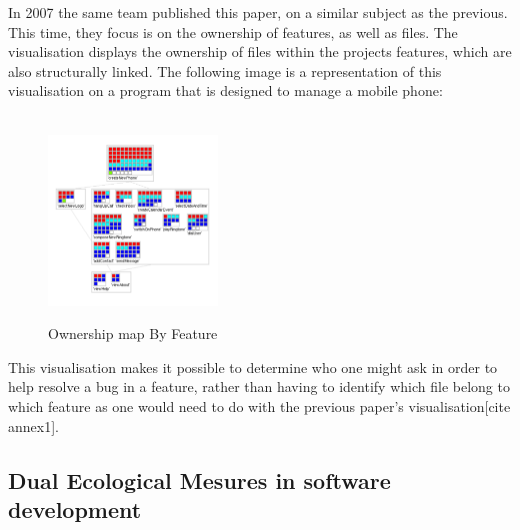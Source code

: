In 2007 the same team published this paper, on a similar subject as the previous. This time, they focus is on the ownership of features, as well as files. The visualisation displays the ownership of files within the projects features, which are also structurally linked. The following image is a representation of this visualisation on a program that is designed to manage a mobile phone:\\
\\
\begin{figure}[p]
\centering
\includegraphics[width=0.4\textwidth]{./resources/girba2007.png}~
\caption{Ownership map By Feature}
\label{fig:ownership_map_by_feature}
\end{figure}

This visualisation makes it possible to determine who one might ask in order to help resolve a bug in a feature, rather than having to identify which file belong to which feature as one would need to do with the previous paper's visualisation[cite annex1].

\subsection{Dual Ecological Mesures in software development}

